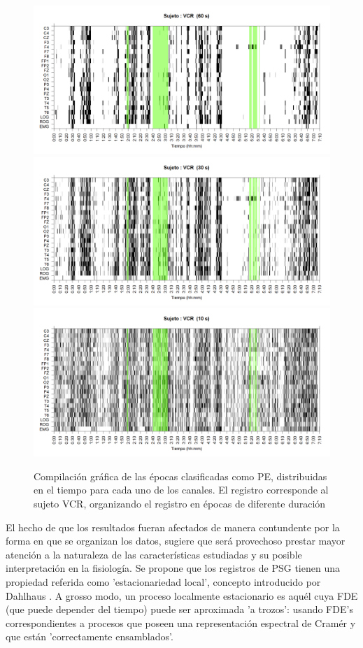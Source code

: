 \begin{figure}
\centering
\includegraphics[width=0.9\linewidth] 
{./img_ejemplos/VCNNS1_est_60.png} 
\\
\includegraphics[width=0.9\linewidth]
{./img_ejemplos/VCNNS1_est_30.png} 
\\
\includegraphics[width=0.9\linewidth]
{./img_ejemplos/VCNNS1_est_10.png} 
\caption{Compilación gráfica de las épocas clasificadas como PE, distribuidas en el tiempo
para cada uno de los canales. El registro corresponde al sujeto VCR, organizando el registro en
épocas de diferente duración}
\label{comp_VCR}
\end{figure}

El hecho de que los resultados fueran afectados de manera contundente por la forma en que se 
organizan los datos, sugiere que será provechoso prestar mayor atención a la naturaleza de las 
características estudiadas y su posible interpretación en la fisiología.
Se propone que los registros de PSG tienen una propiedad referida como 'estacionariedad local',
concepto introducido por Dahlhaus \cite{Dahlhaus97}.
A grosso modo, un proceso localmente estacionario es aquél cuya FDE (que puede depender del 
tiempo) puede ser aproximada 'a trozos': usando FDE's correspondientes a procesos que poseen una 
representación espectral de Cramér y que están 'correctamente ensamblados'.

